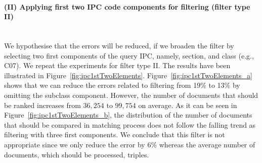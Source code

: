 \paragraph{(II) Applying first two IPC code components for filtering (filter type II)}
\ \\
We hypothesise that the errors will be reduced, if we broaden the filter by selecting two first components of the query IPC, namely, section, and class (e.g., C07). We repeat the experiments for filter type II.
The results have been illustrated in Figure~\ref{fig:ipc1stTwoElements}. Figure~\ref{fig:ipc1stTwoElements_a} shows that we can reduce the errors related to filtering from 19\% to 13\% by omitting the subclass component. However, the number of documents that should be ranked increases from $ 36,254 $ to $ 99,754 $ on average. As it can be seen in Figure~\ref{fig:ipc1stTwoElements_b}, the distribution of the number of documents that should be compared in matching process does not follow the falling trend as filtering with three first components. We conclude that this filter is not appropriate since we only reduce the error by 6\% whereas the average number of documents, which should be processed, triples.    
